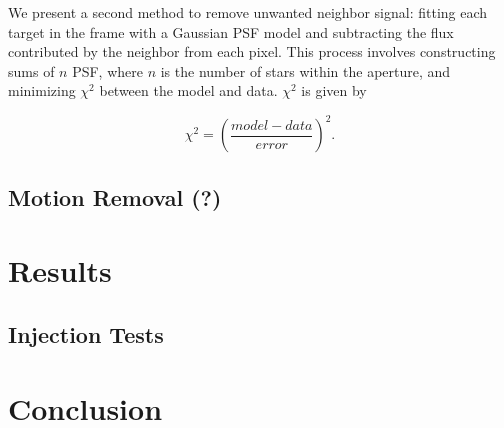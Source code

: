 \documentclass[12pt,preprint]{aastex}
\begin{document}
We present a second method to remove unwanted neighbor signal: fitting each target in the frame with a Gaussian PSF model and subtracting the flux contributed by the neighbor from each pixel. This process involves constructing sums of $n$ PSF, where $n$ is the number of stars within the aperture, and minimizing $\chi^2$ between the model and data. $\chi^2$ is given by

\[
\tag{4}
\chi^2 = \left( \frac{model-data}{error} \right)^2.
\]

\subsection{Motion Removal (?)}

\section{Results}

\subsection{Injection Tests}

\section{Conclusion}

\clearpage


\end{document}
